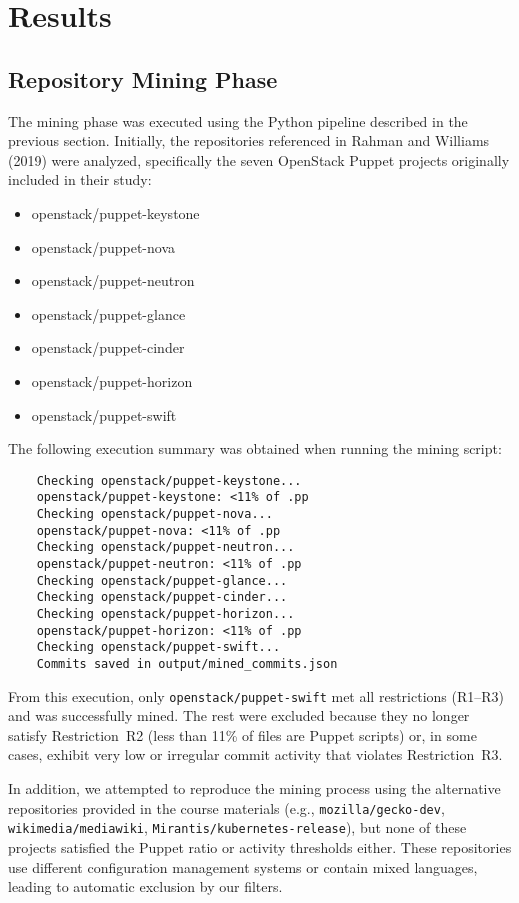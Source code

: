 \documentclass[conference]{IEEEtran}
\begin{document}
	
\section{Results}
\subsection{Repository Mining Phase}
The mining phase was executed using the Python pipeline described in the previous section. Initially, the repositories referenced in Rahman and Williams (2019) were analyzed, specifically the seven OpenStack Puppet projects originally included in their study:

\begin{itemize}
	\item openstack/puppet-keystone
	\item openstack/puppet-nova
	\item openstack/puppet-neutron
	\item openstack/puppet-glance
	\item openstack/puppet-cinder
	\item openstack/puppet-horizon
	\item openstack/puppet-swift
\end{itemize}

The following execution summary was obtained when running the mining script:

\begin{verbatim}
	Checking openstack/puppet-keystone...
	openstack/puppet-keystone: <11% of .pp
	Checking openstack/puppet-nova...
	openstack/puppet-nova: <11% of .pp
	Checking openstack/puppet-neutron...
	openstack/puppet-neutron: <11% of .pp
	Checking openstack/puppet-glance...
	Checking openstack/puppet-cinder...
	Checking openstack/puppet-horizon...
	openstack/puppet-horizon: <11% of .pp
	Checking openstack/puppet-swift...
	Commits saved in output/mined_commits.json
\end{verbatim}

From this execution, only \texttt{openstack/puppet-swift} met all restrictions (R1–R3) and was successfully mined. The rest were excluded because they no longer satisfy Restriction~R2 (less than 11\% of files are Puppet scripts) or, in some cases, exhibit very low or irregular commit activity that violates Restriction~R3.

In addition, we attempted to reproduce the mining process using the alternative repositories provided in the course materials (e.g., \texttt{mozilla/gecko-dev}, \texttt{wikimedia/mediawiki}, \texttt{Mirantis/kubernetes-release}), but none of these projects satisfied the Puppet ratio or activity thresholds either. These repositories use different configuration management systems or contain mixed languages, leading to automatic exclusion by our filters.
\end{document}
